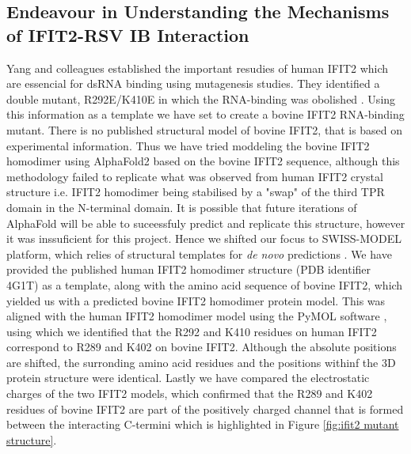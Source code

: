\subsection{Endeavour in Understanding the Mechanisms of IFIT2-RSV IB Interaction} \label{subsec:Endeavour in Understanding the Mechanisms of IFIT2-RSV IB Interaction}
Yang and colleagues established the important resudies of human IFIT2 which are essencial for dsRNA binding using mutagenesis studies. They identified a double mutant, R292E/K410E in which the RNA-binding was obolished \cite{Yang2012CrystalMechanisms}. Using this information as a template we have set to create a bovine IFIT2 RNA-binding mutant. There is no published structural model of bovine IFIT2, that is based on experimental information. Thus we have tried moddeling the bovine IFIT2 homodimer using AlphaFold2 \cite{Jumper2021HighlyAlphaFold} based on the bovine IFIT2 sequence, although this methodology failed to replicate what was observed from human IFIT2 crystal structure i.e. IFIT2 homodimer being stabilised by a "swap" of the third TPR domain in the N-terminal domain. It is possible that future iterations of AlphaFold will be able to suceessfuly predict and replicate this structure, however it was inssuficient for this project. Hence we shifted our focus to SWISS-MODEL platform, which relies of structural templates for \textit{de novo} predictions \cite{Waterhouse2018SWISS-MODEL:Complexes}. We have provided the published human IFIT2 homodimer structure (PDB identifier 4G1T) as a template, along with the amino acid sequence of bovine IFIT2, which yielded us with a predicted bovine IFIT2 homodimer protein model. This was aligned with the human IFIT2 homodimer model using the PyMOL software \cite{SchrodingerTeam2023TheSystem}, using which we identified that the R292 and K410 residues on human IFIT2 correspond to R289 and K402 on bovine IFIT2. Although the absolute positions are shifted, the surronding amino acid residues and the positions withinf the 3D protein structure were identical. Lastly we have compared the electrostatic charges of the two IFIT2 models, which confirmed that the R289 and K402 residues of bovine IFIT2 are part of the positively charged channel that is formed between the interacting C-termini which is highlighted in Figure \ref{fig:ifit2 mutant structure}.

